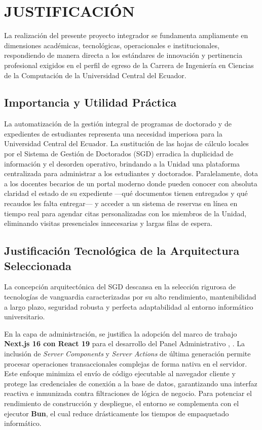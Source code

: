 
\section{JUSTIFICACIÓN}

La realización del presente proyecto integrador se fundamenta ampliamente en dimensiones académicas, tecnológicas, operacionales e institucionales, respondiendo de manera directa a los estándares de innovación y pertinencia profesional exigidos en el perfil de egreso de la Carrera de Ingeniería en Ciencias de la Computación de la Universidad Central del Ecuador.

\subsection{Importancia y Utilidad Práctica}

La automatización de la gestión integral de programas de doctorado y de expedientes de estudiantes representa una necesidad imperiosa para la Universidad Central del Ecuador. La sustitución de las hojas de cálculo locales por el Sistema de Gestión de Doctorados (SGD) erradica la duplicidad de información y el desorden operativo, brindando a la Unidad una plataforma centralizada para administrar a los estudiantes y doctorados. Paralelamente, dota a los docentes becarios de un portal moderno donde pueden conocer con absoluta claridad el estado de su expediente —qué documentos tienen entregados y qué recaudos les falta entregar— y acceder a un sistema de reservas en línea en tiempo real para agendar citas personalizadas con los miembros de la Unidad, eliminando visitas presenciales innecesarias y largas filas de espera.

\subsection{Justificación Tecnológica de la Arquitectura Seleccionada}

La concepción arquitectónica del SGD descansa en la selección rigurosa de tecnologías de vanguardia caracterizadas por su alto rendimiento, mantenibilidad a largo plazo, seguridad robusta y perfecta adaptabilidad al entorno informático universitario.

En la capa de administración, se justifica la adopción del marco de trabajo \textbf{Next.js 16 con React 19} para el desarrollo del Panel Administrativo \cite{vercel_nextjs}, \cite{banks_react}. La inclusión de \textit{Server Components} y \textit{Server Actions} de última generación permite procesar operaciones transaccionales complejas de forma nativa en el servidor. Este enfoque minimiza el envío de código ejecutable al navegador cliente y protege las credenciales de conexión a la base de datos, garantizando una interfaz reactiva e inmunizada contra filtraciones de lógica de negocio. Para potenciar el rendimiento de construcción y despliegue, el entorno se complementa con el ejecutor \textbf{Bun}, el cual reduce drásticamente los tiempos de empaquetado informático.

